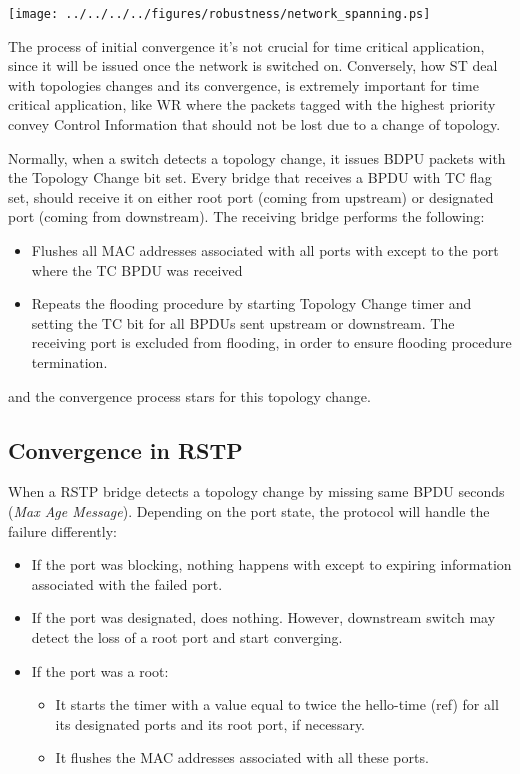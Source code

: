 \begin{center}
        \texttt{[image: ../../../../figures/robustness/network\_spanning.ps]}
        \label{fig:free_loops}
\end{center}

The process of initial convergence it's not crucial for time
critical application, since it will be issued once the network is switched on.
Conversely, how ST deal with topologies changes and its
convergence, is extremely important for time critical application, like WR where
the packets tagged with the highest priority convey Control Information that
should not be lost due to a change of topology.

Normally, when a switch detects a topology change, it issues BDPU packets with
the Topology Change bit set. Every bridge that receives a BPDU with TC flag set,
should  receive it on either root port (coming from upstream) or designated port
(coming from downstream). The receiving bridge performs the following:
\begin{itemize}

        \item Flushes all MAC addresses associated with all ports with except to
the port where the TC BPDU was received
        \item Repeats the flooding procedure by starting Topology Change timer
and setting the TC bit for all BPDUs sent upstream or downstream. The receiving
port is excluded from flooding, in order to ensure flooding procedure
termination.
\end{itemize}
and the convergence process stars for this topology change. 

\subsection{Convergence in RSTP}

When a RSTP bridge detects a topology change by missing same BPDU seconds
(\textsl{Max Age Message}). Depending on the port state, the protocol will
handle the failure differently: 

\begin{itemize}

	\item If the port was blocking, nothing happens with except to expiring 
information associated with the failed port.
	\item If the port was designated, does nothing. However, downstream
switch may detect the loss of a root port and start converging. 
	\item If the port was a root: 

	\begin{itemize}
		\item It starts the  timer with a value equal to twice the 
hello-time (ref) for all its designated ports and its root port, if necessary.
		\item It flushes the MAC addresses associated with all these
ports.
	\end{itemize}

\end{itemize}


